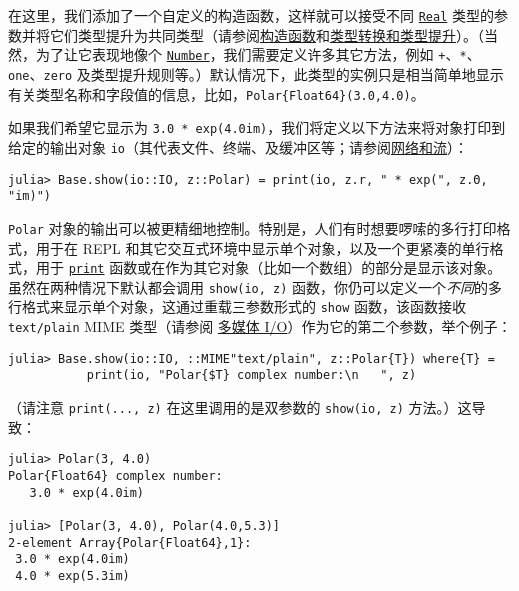 在这里，我们添加了一个自定义的构造函数，这样就可以接受不同 \hyperlink{6175959395021454412}{\texttt{Real}} 类型的参数并将它们类型提升为共同类型（请参阅\hyperlink{1489967485005487723}{构造函数}和\hyperlink{10374023657104680331}{类型转换和类型提升}）。（当然，为了让它表现地像个 \hyperlink{1990584313715697055}{\texttt{Number}}，我们需要定义许多其它方法，例如 \texttt{+}、\texttt{*}、\texttt{one}、\texttt{zero} 及类型提升规则等。）默认情况下，此类型的实例只是相当简单地显示有关类型名称和字段值的信息，比如，\texttt{Polar\{Float64\}(3.0,4.0)}。



如果我们希望它显示为 \texttt{3.0 * exp(4.0im)}，我们将定义以下方法来将对象打印到给定的输出对象 \texttt{io}（其代表文件、终端、及缓冲区等；请参阅\hyperlink{4176621353987521289}{网络和流}）：




\begin{verbatim}
julia> Base.show(io::IO, z::Polar) = print(io, z.r, " * exp(", z.Θ, "im)")
\end{verbatim}



\texttt{Polar} 对象的输出可以被更精细地控制。特别是，人们有时想要啰嗦的多行打印格式，用于在 REPL 和其它交互式环境中显示单个对象，以及一个更紧凑的单行格式，用于 \hyperlink{8248717042415202230}{\texttt{print}} 函数或在作为其它对象（比如一个数组）的部分是显示该对象。虽然在两种情况下默认都会调用 \texttt{show(io, z)} 函数，你仍可以定义一个\emph{不同}的多行格式来显示单个对象，这通过重载三参数形式的 \texttt{show} 函数，该函数接收 \texttt{text/plain} MIME 类型（请参阅 \hyperlink{9485638019478733873}{多媒体 I/O}）作为它的第二个参数，举个例子：




\begin{verbatim}
julia> Base.show(io::IO, ::MIME"text/plain", z::Polar{T}) where{T} =
           print(io, "Polar{$T} complex number:\n   ", z)
\end{verbatim}



（请注意 \texttt{print(..., z)} 在这里调用的是双参数的 \texttt{show(io, z)} 方法。）这导致：




\begin{verbatim}
julia> Polar(3, 4.0)
Polar{Float64} complex number:
   3.0 * exp(4.0im)

julia> [Polar(3, 4.0), Polar(4.0,5.3)]
2-element Array{Polar{Float64},1}:
 3.0 * exp(4.0im)
 4.0 * exp(5.3im)
\end{verbatim}



